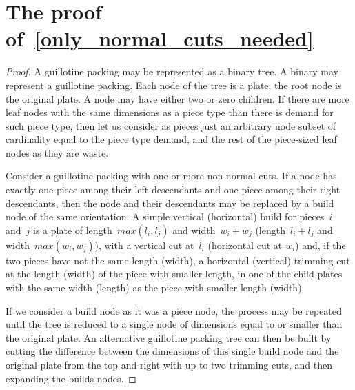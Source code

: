 \documentclass[smallextended]{svjour3}       %
\begin{document}
%



\pagebreak
\appendix

\section{The proof of~\autoref{only_normal_cuts_needed}}
\label{app:proof_only_normal_cuts_needed}

\begin{proof}
A guillotine packing may be represented as a binary tree.
A binary may represent a guillotine packing.
Each node of the tree is a plate; the root node is the original plate.
A node may have either two or zero children.
If there are more leaf nodes with the same dimensions as a piece type than there is demand for such piece type, then let us consider as pieces just an arbitrary node subset of cardinality equal to the piece type demand, and the rest of the piece-sized leaf nodes as they are waste.

Consider a guillotine packing with one or more non-normal cuts.
If a node has exactly one piece among their left descendants and one piece among their right descendants, then the node and their descendants may be replaced by a build node of the same orientation.
A simple vertical (horizontal) build for pieces~\(i\) and~\(j\) is a plate of length~\(max(l_i, l_j)\) and width~\(w_i + w_j\) (length~\(l_i + l_j\) and width~\(max(w_i, w_j)\)), with a vertical cut at~\(l_i\) (horizontal cut at \(w_i\)) and, if the two pieces have not the same length (width), a horizontal (vertical) trimming cut at the length (width) of the piece with smaller length, in one of the child plates with the same width (length) as the piece with smaller length (width).

If we consider a build node as it was a piece node, the process may be repeated until the tree is reduced to a single node of dimensions equal to or smaller than the original plate.
An alternative guillotine packing tree can then be built by cutting the difference between the dimensions of this single build node and the original plate from the top and right with up to two trimming cuts, and then expanding the builds nodes.


\end{proof}
\end{document}
